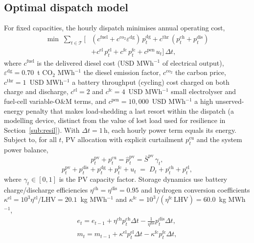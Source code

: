 \documentclass[preprint,12pt]{elsarticle}
\begin{document}
\subsection{Optimal dispatch model}
For fixed capacities, the hourly dispatch minimises annual operating cost,
\begin{equation}
\label{eq:obj}
\begin{aligned}
\min \; \sum_{t\in\mathcal{T}} \Big[ & (c^{\mathrm{fuel}} + c^{\mathrm{co_2}}\varepsilon^{\mathrm{dg}})\,p^{\mathrm{dg}}_t + c^{\mathrm{thr}}\,(p^{\mathrm{ch}}_t + p^{\mathrm{dis}}_t) \\
& + c^{\mathrm{el}}\,p^{\mathrm{el}}_t + c^{\mathrm{fc}}\,p^{\mathrm{fc}}_t + c^{\mathrm{pen}}\,u_t \Big]\,\Delta t,
\end{aligned}
\end{equation}
where $c^{\mathrm{fuel}}$ is the delivered diesel cost (USD MWh$^{-1}$ of
electrical output), $\varepsilon^{\mathrm{dg}}=0.70$~t CO$_2$ MWh$^{-1}$ the diesel
emission factor, $c^{\mathrm{co_2}}$ the carbon price, $c^{\mathrm{thr}}=1$~USD
MWh$^{-1}$ a battery throughput (cycling) cost charged on both charge and
discharge, $c^{\mathrm{el}}=2$ and $c^{\mathrm{fc}}=4$~USD MWh$^{-1}$ small
electrolyser and fuel-cell variable-O\&M terms, and $c^{\mathrm{pen}}=10{,}000$~USD
MWh$^{-1}$ a high unserved-energy penalty that makes load-shedding a last resort
within the dispatch (a modelling device, distinct from the value of lost load used
for resilience in Section~\ref{sub:resil}). With $\Delta t=1\,\mathrm{h}$, each
hourly power term equals its energy. Subject to, for all $t$, PV allocation with
explicit curtailment $p^{\mathrm{cu}}_t$ and the system power balance,
\begin{equation}
\label{eq:pv}
p^{\mathrm{pv}}_t + p^{\mathrm{cu}}_t = \hat{p}^{\mathrm{pv}}_t = \bar S^{\mathrm{pv}}\,\gamma_t,
\end{equation}
\begin{equation}
\label{eq:bal}
p^{\mathrm{pv}}_t + p^{\mathrm{dis}}_t + p^{\mathrm{dg}}_t + p^{\mathrm{fc}}_t + u_t \;=\; D_t + p^{\mathrm{ch}}_t + p^{\mathrm{el}}_t,
\end{equation}
where $\gamma_t\in[0,1]$ is the PV capacity factor. Storage dynamics use battery
charge/discharge efficiencies $\eta^{\mathrm{ch}}=\eta^{\mathrm{dis}}=0.95$ and
hydrogen conversion coefficients
$\kappa^{\mathrm{el}}=10^{3}\eta^{\mathrm{el}}/\mathrm{LHV}=20.1$~kg MWh$^{-1}$ and
$\kappa^{\mathrm{fc}}=10^{3}/(\eta^{\mathrm{fc}}\,\mathrm{LHV})=60.0$~kg MWh$^{-1}$,
\begin{equation}
\label{eq:soc}
\begin{gathered}
e_t = e_{t-1} + \eta^{\mathrm{ch}} p^{\mathrm{ch}}_t \Delta t - \tfrac{1}{\eta^{\mathrm{dis}}} p^{\mathrm{dis}}_t \Delta t, \\
m_t = m_{t-1} + \kappa^{\mathrm{el}} p^{\mathrm{el}}_t \Delta t - \kappa^{\mathrm{fc}} p^{\mathrm{fc}}_t \Delta t,
\end{gathered}
\end{equation}
\end{document}
